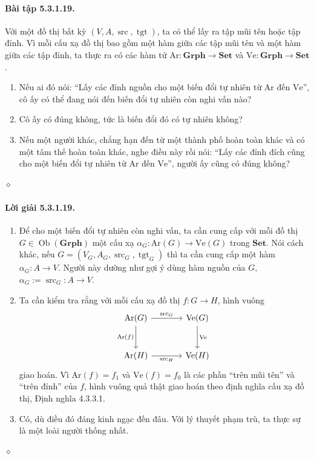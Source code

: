 \paragraph{Bài tập 5.3.1.19.} Với một đồ thị bất kỳ $(V,A,\operatorname{src},\operatorname{tgt})$, ta có thể lấy ra tập mũi tên hoặc tập đỉnh. Vì mỗi cấu xạ đồ thị bao gồm một hàm giữa các tập mũi tên và một hàm giữa các tập đỉnh, ta thực ra có các hàm tử $\mathrm{Ar}:\mathbf{Grph}\to\mathbf{Set}$ và $\mathrm{Ve}:\mathbf{Grph}\to\mathbf{Set}$.
\begin{enumerate}[label=\alph*.]
\item Nếu ai đó nói: ``Lấy các đỉnh nguồn cho một biến đổi tự nhiên từ $\mathrm{Ar}$ đến $\mathrm{Ve}$'', cô ấy có thể đang nói đến biến đổi tự nhiên còn nghi vấn nào?
\item Cô ấy có đúng không, tức là biến đổi đó có tự nhiên không?
\item Nếu một người khác, chẳng hạn đến từ một thành phố hoàn toàn khác và có một tâm thế hoàn toàn khác, nghe điều này rồi nói: ``Lấy các đỉnh đích cũng cho một biến đổi tự nhiên từ $\mathrm{Ar}$ đến $\mathrm{Ve}$'', người ấy cũng có đúng không?
\end{enumerate}\hfill$\diamond$
\paragraph{Lời giải 5.3.1.19.}
\begin{enumerate}[label=\alph*.]
\item Để cho một biến đổi tự nhiên còn nghi vấn, ta cần cung cấp với mỗi đồ thị $G\in\operatorname{Ob}(\mathbf{Grph})$ một cấu xạ $\alpha_G:\mathrm{Ar}(G)\to\mathrm{Ve}(G)$ trong $\mathbf{Set}$. Nói cách khác, nếu $G=(V_G,A_G,\operatorname{src}_G,\operatorname{tgt}_G)$ thì ta cần cung cấp một hàm $\alpha_G:A\to V$. Người này dường như gợi ý dùng hàm nguồn của $G$, $\alpha_G:=\operatorname{src}_G:A\to V$.
\item Ta cần kiểm tra rằng với mỗi cấu xạ đồ thị $f:G\to H$, hình vuông
\[\begin{tikzcd}[column sep=large,row sep=large]
\mathrm{Ar}(G)\arrow[r,"\operatorname{src}_G"]\arrow[d,"\mathrm{Ar}(f)"']&\mathrm{Ve}(G)\arrow[d,"\mathrm{Ve}"]\\\mathrm{Ar}(H)\arrow[r,"\operatorname{src}_H"']&\mathrm{Ve}(H)
\end{tikzcd}\]
giao hoán. Vì $\mathrm{Ar}(f)=f_1$ và $\mathrm{Ve}(f)=f_0$ là các phần ``trên mũi tên'' và ``trên đỉnh'' của $f$, hình vuông quả thật giao hoán theo định nghĩa cấu xạ đồ thị, Định nghĩa 4.3.3.1.
\item Có, dù điều đó đáng kinh ngạc đến đâu. Với lý thuyết phạm trù, ta thực sự là một loài người thống nhất.
\end{enumerate}\hfill$\diamond$
